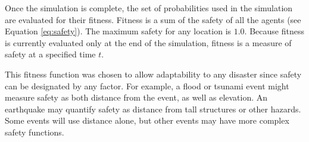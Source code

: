 \documentclass{sig-alternate-05-2015}
\begin{document}
Once the simulation is complete, the set of probabilities used in the
simulation are evaluated for their fitness.  Fitness is a sum of the
safety of all the agents (see Equation \ref{eq:safety}).  The maximum
safety for any location is $1.0$.  Because fitness is currently
evaluated only at the end of the simulation, fitness is a measure of
safety at a specified time $t$.

This fitness function was chosen to allow adaptability to any disaster
since safety can be designated by any factor.  For example, a flood or
tsunami event might measure safety as both distance from the event, as
well as elevation.  An earthquake may quantify safety as distance from
tall structures or other hazards.  Some events will use distance
alone, but other events may have more complex safety functions.
\end{document}
